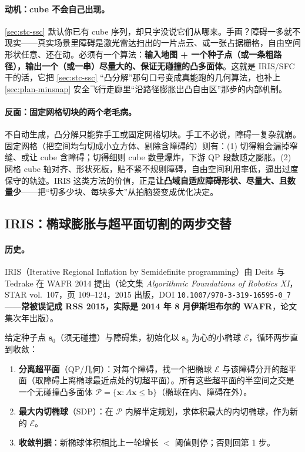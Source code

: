 \paragraph{动机：cube 不会自己出现。}
\cref{sec:stc-ssc} 默认你已有 cube 序列，却只字没说它们从哪来。手画？障碍一多就不现实——真实场景里障碍是激光雷达扫出的一片点云、或一张占据栅格，自由空间形状任意、还在动。必须有一个算法：\textbf{输入地图 + 一个种子点（或一条粗路径），输出一个（或一串）尽量大的、保证无碰撞的凸多面体}。这就是 IRIS/SFC 干的活，它把 \cref{sec:stc-ssc} “凸分解”那句口号变成真能跑的几何算法，也补上 \cref{sec:plan-minsnap} 安全飞行走廊里“沿路径膨胀出凸自由区”那步的内部机制。

\paragraph{反面：固定网格切块的两个老毛病。}
不自动生成，凸分解只能靠手工或固定网格切块。手工不必说，障碍一复杂就崩。固定网格（把空间均匀切成小立方体、剔除含障碍的）则有：(1) 切得粗会漏掉窄缝、或让 cube 含障碍；切得细则 cube 数量爆炸，下游 QP 段数随之膨胀。(2) 网格 cube 轴对齐、形状死板，贴不紧不规则障碍，自由空间利用率低，逼出过度保守的轨迹。IRIS 这类方法的价值，正是\textbf{让凸域自适应障碍形状、尽量大、且数量少}——把“切多少块、每块多大”从拍脑袋变成优化决定。

\subsection{IRIS：椭球膨胀与超平面切割的两步交替}
\label{sec:stc-iris-alg}

\paragraph{历史。}
IRIS（Iterative Regional Inflation by Semidefinite programming）由 Deits 与 Tedrake 在 WAFR 2014 提出\cite{deits2015iris}（论文集 \emph{Algorithmic Foundations of Robotics XI}，STAR vol.\ 107，页 109--124，2015 出版，DOI \texttt{10.1007/978-3-319-16595-0\_7}——\textbf{常被误记成 RSS 2015，实际是 2014 年 8 月伊斯坦布尔的 WAFR}，论文集次年出版）。

\begin{algo}\label{alg:stc-iris}
给定种子点 $\mathbf{s}_0$（须无碰撞）与障碍集，初始化以 $\mathbf{s}_0$ 为心的小椭球 $\mathcal{E}$，循环两步直到收敛：
\begin{enumerate}
  \item \textbf{分离超平面}（QP/几何）：对每个障碍，找一个把椭球 $\mathcal{E}$ 与该障碍分开的超平面（取障碍上离椭球最近点处的切超平面）。所有这些超平面的半空间之交是一个无碰撞凸多面体 $\mathcal{P}=\{\mathbf{x}:A\mathbf{x}\le\mathbf{b}\}$（椭球在内、障碍在外）。
  \item \textbf{最大内切椭球}（SDP）：在 $\mathcal{P}$ 内解半定规划，求体积最大的内切椭球，作为新的 $\mathcal{E}$。
  \item \textbf{收敛判据}：新椭球体积相比上一轮增长 $<$ 阈值则停；否则回第 1 步。
\end{enumerate}
\end{algo}

